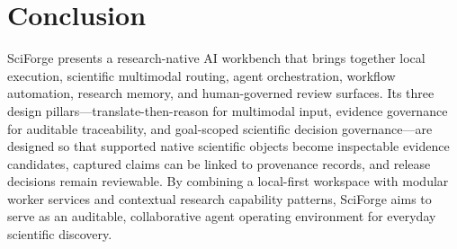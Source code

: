 \documentclass[sn-basic,Numbered,pdflatex]{sn-jnl}
\begin{document}
\section{Conclusion}

SciForge presents a research-native AI workbench that brings together local execution, scientific multimodal routing, agent orchestration, workflow automation, research memory, and human-governed review surfaces. Its three design pillars---translate-then-reason for multimodal input, evidence governance for auditable traceability, and goal-scoped scientific decision governance---are designed so that supported native scientific objects become inspectable evidence candidates, captured claims can be linked to provenance records, and release decisions remain reviewable. By combining a local-first workspace with modular worker services and contextual research capability patterns, SciForge aims to serve as an auditable, collaborative agent operating environment for everyday scientific discovery.
\end{document}
